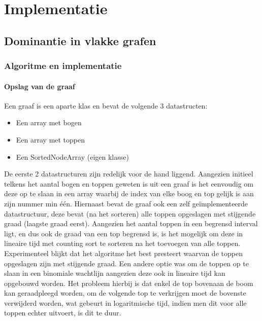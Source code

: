 \documentclass[11pt, a4paper, table]{article}
\theoremstyle{definition}
\theoremstyle{definition}
\theoremstyle{definition}
\begin{document}
\section{Implementatie}
\subsection{Dominantie in vlakke grafen}
\subsubsection{Algoritme en implementatie}
\paragraph{Opslag van de graaf}
Een graaf is een aparte klas en bevat de volgende 3 datastructen:
\begin{itemize}
	\item Een array met bogen
	\item Een array met toppen
	\item Een SortedNodeArray (eigen klasse)
\end{itemize}
De eerste 2 datastructuren zijn redelijk voor de hand liggend. Aangezien initieel telkens het aantal bogen en toppen geweten is uit een graaf is het eenvoudig om deze op te slaan in een array waarbij de index van elke boog en top gelijk is aan zijn nummer min \'{e}\'{e}n. Hiernaast bevat de graaf ook een zelf ge\"{i}mplementeerde datastructuur, deze bevat (na het sorteren) alle toppen opgeslagen met stijgende graad (laagste graad eerst). Aangezien het aantal toppen in een begrensd interval ligt, en dus ook de graad van een top begrensd is, is het mogelijk om deze in lineaire tijd met counting sort te sorteren na het toevoegen van alle toppen. Experimenteel blijkt dat het algoritme het best presteert waarvan de toppen opgeslagen zijn met stijgende graad. Een andere optie was om de toppen op te slaan in een binomiale wachtlijn aangezien deze ook in lineaire tijd kan opgebouwd worden. Het probleem hierbij is dat enkel de top bovenaan de boom kan geraadpleegd worden, om de volgende top te verkrijgen moet de bovenste verwijderd worden, wat gebeurt in logaritmische tijd, indien men dit voor alle toppen echter uitvoert, is dit te duur. 
\end{document}
